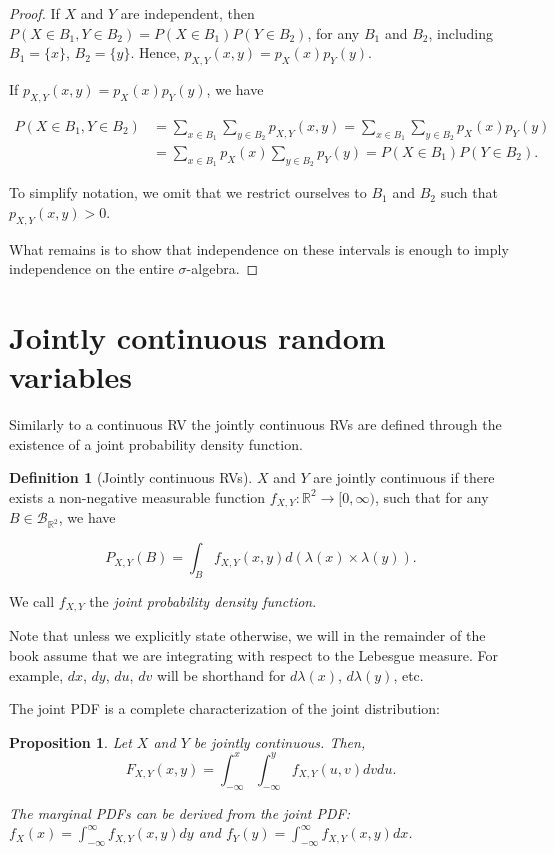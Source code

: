 \documentclass{book}
\theoremstyle{plain}%
\newtheorem{proposition}{Proposition}[section]
\theoremstyle{definition}
\newtheorem{definition}{Definition}[section]
\newlength{\arrow}
\begin{document}
\begin{proof}
If $X$ and $Y$ are independent, then $P(X \in B_1, Y \in B_2) = P(X \in B_1)P(Y \in B_2)$, for any $B_1$ and $B_2$, including $B_1 = \{x\}$, $B_2 = \{y\}$. Hence, $p_{X,Y}(x,y) = p_X(x)p_Y(y)$.

If $p_{X,Y}(x,y) = p_X(x)p_Y(y)$, we have

\begin{align*}
P(X \in B_1, Y \in B_2) &= \sum_{x \in B_1} \sum_{y \in B_2} p_{X,Y}(x,y) = \sum_{x \in B_1} \sum_{y \in B_2} p_{X}(x)p_{Y}(y)\\
&=\sum_{x \in B_1} p_{X}(x) \sum_{y \in B_2} p_{Y}(y) = P(X \in B_1)P(Y \in B_2).
\end{align*}

To simplify notation, we omit that we restrict ourselves to $B_1$ and $B_2$ such that $p_{X,Y}(x,y) > 0$.

What remains is to show that independence on these intervals is enough to imply independence on the entire $\sigma$-algebra.

\end{proof}

\section{Jointly continuous random variables}

Similarly to a continuous RV the jointly continuous RVs are defined through the existence of a joint probability density function.

\begin{definition}[Jointly continuous RVs]
$X$ and $Y$ are jointly continuous if there exists a non-negative measurable function $f_{X,Y}:\mathbb{R}^2 \rightarrow [0, \infty)$, such that for any $B \in \mathcal{B}_{\mathbb{R}^2}$, we have

$$P_{X,Y}(B) = \int_{B} f_{X,Y}(x, y) d(\lambda(x) \times \lambda(y)).$$

We call $f_{X,Y}$ the \emph{joint probability density function}.
\end{definition}

Note that unless we explicitly state otherwise, we will in the remainder of the book assume that we are integrating with respect to the Lebesgue measure. For example, $dx$, $dy$, $du$, $dv$ will be shorthand for $d\lambda(x)$, $d\lambda(y)$, etc.

The joint PDF is a complete characterization of the joint distribution:

\begin{proposition}
Let $X$ and $Y$ be jointly continuous. Then,
$$F_{X,Y}(x,y) = \int_{-\infty}^x \int_{-\infty}^y f_{X,Y}(u,v)dvdu.$$

The marginal PDFs can be derived from the joint PDF: $f_X(x) = \int_{-\infty}^\infty f_{X,Y}(x,y)dy$ and $f_Y(y) = \int_{-\infty}^\infty f_{X,Y}(x,y)dx$.
\end{proposition}
\end{document}
